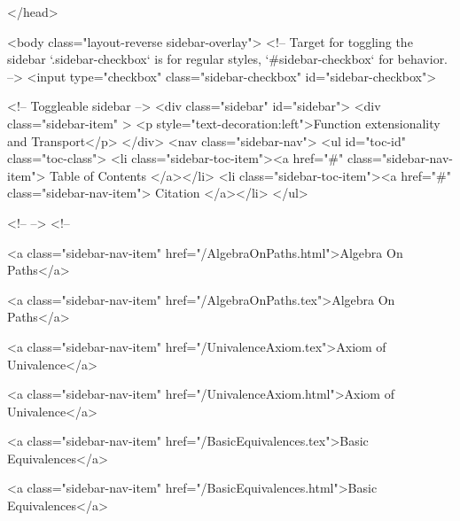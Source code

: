   
</head>




  <body class="layout-reverse sidebar-overlay">
    <!-- Target for toggling the sidebar `.sidebar-checkbox` is for regular
     styles, `#sidebar-checkbox` for behavior. -->
<input type="checkbox" class="sidebar-checkbox" id="sidebar-checkbox">

<!-- Toggleable sidebar -->
<div class="sidebar" id="sidebar">
  <div class="sidebar-item" >
    <p style="text-decoration:left">Function extensionality and Transport</p>
  </div>
  <nav class="sidebar-nav">
    <ul id="toc-id" class="toc-class">
  <li class="sidebar-toc-item"><a href="#" class="sidebar-nav-item"> Table of Contents </a></li>
  <li class="sidebar-toc-item"><a href="#" class="sidebar-nav-item"> Citation </a></li>
</ul>


    <!--  -->
    <!-- 
      
    
      
    
      
    
      
    
      
        
      
    
      
        
          <a class="sidebar-nav-item" href="/AlgebraOnPaths.html">Algebra On Paths</a>
        
      
    
      
        
          <a class="sidebar-nav-item" href="/AlgebraOnPaths.tex">Algebra On Paths</a>
        
      
    
      
        
          <a class="sidebar-nav-item" href="/UnivalenceAxiom.tex">Axiom of Univalence</a>
        
      
    
      
        
          <a class="sidebar-nav-item" href="/UnivalenceAxiom.html">Axiom of Univalence</a>
        
      
    
      
        
          <a class="sidebar-nav-item" href="/BasicEquivalences.tex">Basic Equivalences</a>
        
      
    
      
        
          <a class="sidebar-nav-item" href="/BasicEquivalences.html">Basic Equivalences</a>
        
